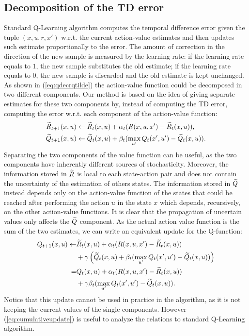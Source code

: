 \documentclass[conference]{IEEEtran}
\begin{document}
\subsection{Decomposition of the TD error}
Standard Q-Learning algorithm computes the temporal difference error given the tuple $(x,u,r,x')$ w.r.t. the current action-value estimates and then updates such estimate proportionally to the error. The amount of correction in the direction of the new sample is measured by the learning rate: if the learning rate equals to $1$, the new sample substitutes the old estimate; if the learning rate equals to $0$, the new sample is discarded and the old estimate is kept unchanged. 
As shown in (\ref{eq:qdecrqtilde}) the action-value function could be decomposed in two different components. Our method is based on the idea of giving separate estimates for these two components by, instead of computing the TD error, computing the error w.r.t. each component of the action-value function:
\begin{align}
\Rtilde_{t+1}(x,u) & \leftarrow\Rtilde_t(x,u)+\alpha_t(R(x,u,x')-\Rtilde_t(x,u)), \label{eq:rtilupdedate}\\
\Qtilde_{t+1}(x,u) & \leftarrow\Qtilde_t(x,u)+\beta_t(\max_{u'}Q_t(x',u')-\Qtilde_t(x,u)).
\label{eq:qtildeupdate}
\end{align}
Separating the two components of the value function can be useful, as the two components have inherently different sources of stochasticity. Moreover, the information stored in $\widetilde{R}$ is local to each state-action pair and does not contain the uncertainty of the estimation of others states. The information stored in $\widetilde{Q}$ instead depends only on the action-value function of the states that could be reached after performing the action $u$ in the state $x$ which depends, recursively, on the other action-value functions. It is clear that the propagation of uncertain values only affects the $\widetilde{Q}$ component.
As the actual action value function is the sum of the two estimates, we can write an equivalent update for the Q-function:
\begin{align}
Q_{t+1}(x,u)\leftarrow&\Rtilde_t(x,u)+\alpha_t(R(x,u,x')-\Rtilde_t(x,u)) \nonumber\\
  & +\gamma\left(\Qtilde_t(x,u)+\beta_t(\max_{u'}Q_t(x',u')-\Qtilde_t(x,u))\right) \nonumber\\
= & Q_t(x,u)+\alpha_t(R(x,u,x')-\Rtilde_t(x,u)) \nonumber\\
  & +\gamma\beta_t(\max_{u'}Q_t(x',u')-\Qtilde_t(x,u)).
 \label{eq:cumulativeupdate}
\end{align}
Notice that this update cannot be used in practice in the algorithm, as it is not keeping the current values of the single components. However (\ref{eq:cumulativeupdate}) is useful to analyze the relations to standard Q-Learning algorithm.
\end{document}
